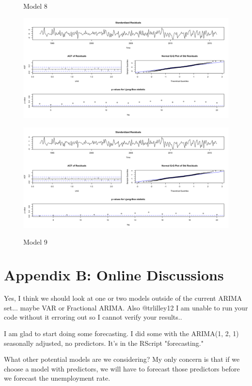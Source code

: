 \documentclass[twoside,twocolumn]{article}
\begin{document}
              \begin{figure}[H]
    	\centering
     	\caption{Model 8}
     	\includegraphics[width=\linewidth]{images/sarima8}
     	\label{fig:sarima8}
     	\caption{Model 9}
     	\includegraphics[width=\linewidth]{images/sarima9}
     	\label{fig:sarima9}
      \end{figure}
      
      \section*{Appendix B: Online Discussions}\label{App:AppendixB}
     


Yes, I think we should look at one or two models outside of the current ARIMA set... maybe VAR or Fractional ARIMA. Also @trlilley12 I am unable to run your code without it erroring out so I cannot verify your results.. 



I am glad to start doing some forecasting. I did some with the ARIMA(1, 2, 1) seasonally adjusted, no predictors. It's in the RScript "forecasting."

What other potential models are we considering? My only concern is that if we choose a model with predictors, we will have to forecast those predictors before we forecast the unemployment rate.
\end{document}
